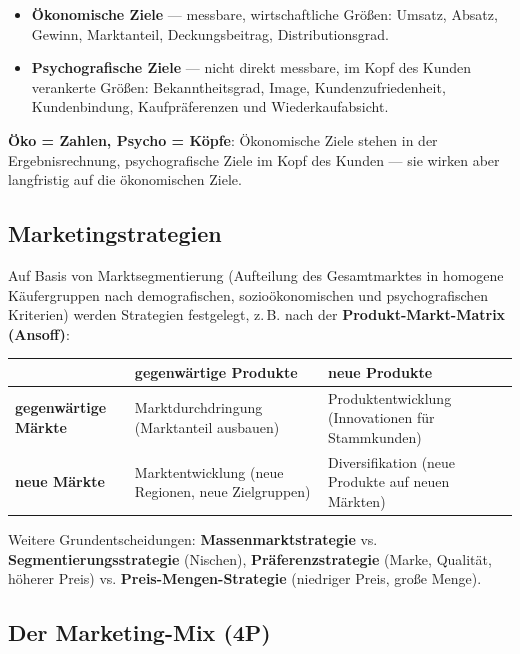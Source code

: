 \documentclass[11pt, a4paper]{article}
\begin{document}
\begin{itemize}
  \item \textbf{Ökonomische Ziele} --- messbare, wirtschaftliche Größen: Umsatz, Absatz,
    Gewinn, Marktanteil, Deckungsbeitrag, Distributionsgrad.
  \item \textbf{Psychografische Ziele} --- nicht direkt messbare, im Kopf des Kunden
    verankerte Größen: Bekanntheitsgrad, Image, Kundenzufriedenheit, Kundenbindung,
    Kaufpräferenzen und Wiederkaufabsicht.
\end{itemize}

\begin{eselsbruecke}
\textbf{Öko = Zahlen, Psycho = Köpfe}: Ökonomische Ziele stehen in der
Ergebnisrechnung, psychografische Ziele im Kopf des Kunden --- sie wirken aber
langfristig auf die ökonomischen Ziele.
\end{eselsbruecke}

\subsection{Marketingstrategien}

Auf Basis von Marktsegmentierung (Aufteilung des Gesamtmarktes in homogene
Käufergruppen nach demografischen, sozioökonomischen und psychografischen Kriterien)
werden Strategien festgelegt, z.\,B. nach der \textbf{Produkt-Markt-Matrix (Ansoff)}:

\begin{center}
\begin{tabular}{p{3.4cm} p{5.2cm} p{5.2cm}}
 & \textbf{gegenwärtige Produkte} & \textbf{neue Produkte}\\
\hline
\textbf{gegenwärtige Märkte} & Marktdurchdringung (Marktanteil ausbauen) & Produktentwicklung (Innovationen für Stammkunden)\\
\textbf{neue Märkte} & Marktentwicklung (neue Regionen, neue Zielgruppen) & Diversifikation (neue Produkte auf neuen Märkten)\\
\end{tabular}
\end{center}

Weitere Grundentscheidungen: \textbf{Massenmarktstrategie} vs.
\textbf{Segmentierungsstrategie} (Nischen), \textbf{Präferenzstrategie} (Marke, Qualität,
höherer Preis) vs. \textbf{Preis-Mengen-Strategie} (niedriger Preis, große Menge).

\subsection{Der Marketing-Mix (4P)}
\end{document}
